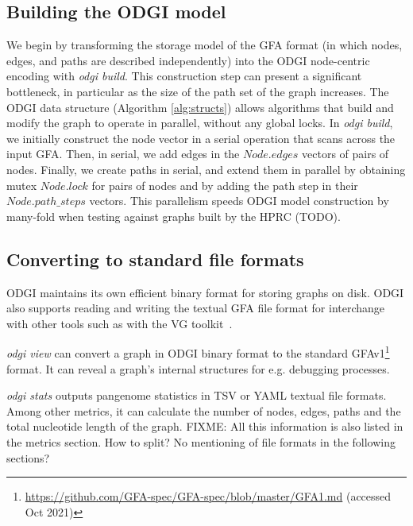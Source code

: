\documentclass{bioinfo}
\begin{document}


\subsection{Building the \textsc{ODGI} model}
\label{sec:build}

We begin by transforming the storage model of the GFA format (in which nodes, edges, and paths are described independently) into the ODGI node-centric encoding with \textit{odgi build}.
This construction step can present a significant bottleneck, in particular as the size of the path set of the graph increases.
The ODGI data structure (Algorithm \ref{alg:structs}) allows algorithms that build and modify the graph to operate in parallel, without any global locks.
In \textit{odgi build}, we initially construct the node vector in a serial operation that scans across the input GFA. Then, in serial, we add edges in the $Node.edges$ vectors of pairs of nodes. Finally, we create paths in serial, and extend them in parallel by obtaining mutex $Node.lock$ for pairs of nodes and by adding the path step in their $Node.path\_steps$ vectors.
This parallelism speeds ODGI model construction by many-fold when testing against graphs built by the HPRC (TODO).


\subsection{Converting to standard file formats}
\label{sec:text}

ODGI maintains its own efficient binary format for storing graphs on disk.
ODGI also supports reading and writing the textual GFA file format for interchange with other tools such as with the VG toolkit~\citep{Garrison:2018}.

\textit{odgi view} can convert a graph in ODGI binary format to the standard GFAv1\footnote{\url{https://github.com/GFA-spec/GFA-spec/blob/master/GFA1.md} (accessed Oct 2021)}  format. It can reveal a graph’s internal structures for e.g. debugging processes.

\textit{odgi stats} outputs pangenome statistics in TSV or YAML textual file formats.
Among other metrics, it can calculate the number of nodes, edges, paths and the total nucleotide length of the graph. {\color{red} FIXME: All this information is also listed in the metrics section. How to split? No mentioning of file formats in the following sections?}
\end{document}
